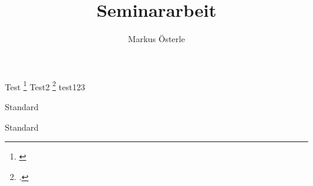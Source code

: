 \documentclass[12pt,a4paper]{report}
\author{Markus Österle}
\title{Seminararbeit}
\begin{document}
\maketitle
\tableofcontents
Test \cite{ta1} \footnote{\cite{ta1}}
\newpage
Test2 \citep{ta1,2} \footcite{ta1}
test123


Standard


\textsf{Standard}

\listoffootnotes 
\printbibliography 
\end{document}
